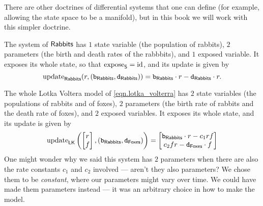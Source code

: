 \documentclass[DynamicalBook]{subfiles}
\begin{document}
\begin{remark}
  There are other doctrines of differential systems that one can define (for
  example, allowing the state space to be a manifold), but in this book we will
  work with this simpler doctrine.
\end{remark}

\begin{example}
  The system of $\mathsf{Rabbits}$ has $1$ state variable (the population of
  rabbits), $2$ parameters (the birth and death rates of the rabbbits), and $1$ exposed
  variable. It exposes its whole state, so that $\mathrm{expose}_{\mathsf{S}} = \mathrm{id}$, and its
  update is given by
  \[
\mathrm{update}_{\mathsf{\mathsf{Rabbits}}}( {r, (\mathtt{b}_{\mathsf{Rabbits}}, \mathtt{d}_{\mathsf{Rabbits}})} )
= \mathtt{b}_{\mathsf{Rabbits}} \cdot r - \mathtt{d}_{\mathsf{Rabbits}} \cdot r.
\]

  The whole Lotka Voltera model of \cref{eqn.lotka_volterra} has $2$ state
  variables (the populations of rabbits and of foxes), $2$ parameters (the birth rate of rabbits and the death rate of foxes), and $2$ exposed
  variables. It exposes its whole state, and its update is given by
  \[
\mathrm{update}_{\mathsf{LK}}\left(  \begin{bmatrix}r \\ f \end{bmatrix}, (\mathtt{b}_{\mathsf{Rabbits}}, \mathtt{d}_{\mathsf{Foxes}})\right)
= \begin{bmatrix} \mathtt{b}_{\mathsf{Rabbits}} \cdot r -  c_1 r f \\ c_2 f r -
  \mathtt{d}_{\mathsf{Foxes}} \cdot f \end{bmatrix}
  \]
  One might wonder why we said this system has $2$ parameters when there are
  also the rate constants $c_1$ and $c_2$ involved --- aren't they also
  parameters? We chose them to be \emph{constant}, where our parameters might
  vary over time. We could have made them parameters instead --- it was an arbitrary choice
  in how to make the model.
\end{example}
\end{document}
